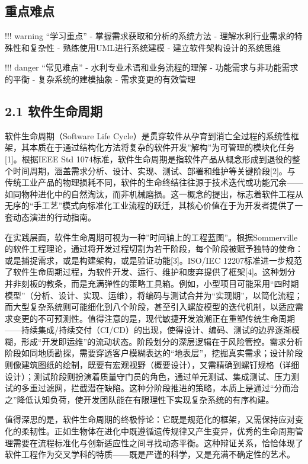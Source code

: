 \subsection{重点难点}\label{ux91cdux70b9ux96beux70b9}

!!! warning ``学习重点'' - 掌握需求获取和分析的系统方法 - 理解水利行业需求的特殊性和复杂性 - 熟练使用UML进行系统建模 - 建立软件架构设计的系统思维

!!! danger ``常见难点'' - 水利专业术语和业务流程的理解 - 功能需求与非功能需求的平衡 - 复杂系统的建模抽象 - 需求变更的有效管理

\subsection{2.1 软件生命周期}\label{ux8f6fux4ef6ux751fux547dux5468ux671f}

软件生命周期（Software Life Cycle）是贯穿软件从孕育到消亡全过程的系统性框架，其本质在于通过结构化方法将复杂的软件开发''解构''为可管理的模块化任务{[}1{]}。根据IEEE Std 1074标准，软件生命周期是指软件产品从概念形成到退役的整个时间周期，涵盖需求分析、设计、实现、测试、部署和维护等关键阶段{[}2{]}。与传统工业产品的物理损耗不同，软件的生命终结往往源于技术迭代或功能冗余------如同物种进化中的自然淘汰，而非机械磨损。这一概念的提出，标志着软件工程从无序的``手工艺''模式向标准化工业流程的跃迁，其核心价值在于为开发者提供了一套动态演进的行动指南。

在实践层面，软件生命周期可视为一种''时间轴上的工程蓝图''。根据Sommerville的软件工程理论，通过将开发过程切割为若干阶段，每个阶段被赋予独特的使命：或是捕捉需求，或是构建架构，或是验证功能{[}3{]}。ISO/IEC 12207标准进一步规范了软件生命周期过程，为软件开发、运行、维护和废弃提供了框架{[}4{]}。这种划分并非刻板的教条，而是充满弹性的策略工具箱。例如，小型项目可能采用``四时期模型''（分析、设计、实现、运维），将编码与测试合并为``实现期''，以简化流程；而大型复杂系统则可能细化到八个阶段，甚至引入螺旋模型的迭代机制，以适应需求变更的不可预测性。值得注意的是，现代敏捷开发浪潮正在重塑传统生命周期------持续集成/持续交付（CI/CD）的出现，使得设计、编码、测试的边界逐渐模糊，形成``开发即运维''的流动状态。阶段划分的深层逻辑在于风险管控。需求分析阶段如同地质勘探，需要穿透客户模糊表达的``地表层''，挖掘真实需求；设计阶段则像建筑图纸的绘制，既要有宏观视野（概要设计），又需精确到螺钉规格（详细设计）；测试阶段则扮演着质量守门员的角色，通过单元测试、集成测试、压力测试的多重过滤网，拦截潜在缺陷。这种分阶段推进的策略，本质上是通过``分而治之''降低认知负荷，使开发团队能在有限理性下实现复杂系统的有序构建。

值得深思的是，软件生命周期的终极悖论：它既是规范化的框架，又需保持应对变化的柔韧性。正如生物体在进化中既遵循遗传规律又产生变异，优秀的生命周期管理需要在流程标准化与创新适应性之间寻找动态平衡。这种辩证关系，恰恰体现了软件工程作为交叉学科的特质------既是严谨的科学，又是充满不确定性的艺术。

